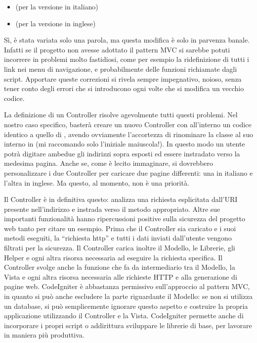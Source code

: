 \begin{itemize}
\item {} (per la versione in italiano)

\item {} (per la versione in inglese)
\end{itemize}

Sì, è stata variata solo una parola, ma questa modifica è solo in parvenza banale. Infatti se il progetto non avesse adottato il pattern \ac{MVC} si sarebbe potuti incorrere in problemi molto fastidiosi, come per esempio la ridefinizione di tutti i link nei menu di navigazione, e probabilmente delle funzioni richiamate dagli script. Apportare queste correzioni si rivela sempre impegnativo, noioso, senza tener conto degli errori che si introducono ogni volte che si modifica un vecchio codice.

La definizione di un Controller risolve agevolmente tutti questi problemi. Nel nostro caso specifico, basterà creare un nuovo Controller  con all'interno un codice identico a quello di , avendo ovviamente l'accortezza di rinominare la classe al suo interno in  (mi raccomando solo l'iniziale maiuscola!). In questo modo un utente potrà digitare ambedue gli indirizzi sopra esposti ed essere instradato verso la medesima pagina. Anche se, come è lecito immaginare, si dovrebbero personalizzare i due Controller per caricare due pagine differenti: una in italiano e l'altra in inglese. Ma questo, al momento, non è una priorità.

Il Controller è in definitiva questo: analizza una richiesta esplicitata dall'\ac{URI} presente nell'indirizzo e instrada verso il metodo appropriato. Altre sue importanti funzionalità hanno ripercussioni positive sulla sicurezza del progetto web tanto per citare un esempio. Prima che il Controller sia caricato e i suoi metodi eseguiti, la ``richiesta http'' e tutti i dati inviati dall'utente vengono filtrati per la sicurezza. Il Controller carica inoltre il Modello, le Librerie, gli Helper e ogni altra risorsa necessaria ad eseguire la richiesta specifica. Il Controller svolge anche la funzione che fa da intermediario tra il Modello, la Vista e ogni altra risorsa necessaria alle richieste \ac{HTTP} e alla generazione di pagine web. CodeIgniter è abbastanza permissivo sull'approccio al pattern \ac{MVC}, in quanto si può anche escludere la parte riguardante il Modello: se non si utilizza un database, si può semplicemente ignorare questo aspetto  e costruire la propria applicazione utilizzando il Controller e la Vista. CodeIgniter permette anche di incorporare i propri script o addirittura sviluppare le librerie di base, per lavorare in maniera più produttiva.

